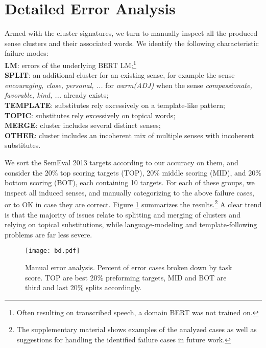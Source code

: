 \documentclass[11pt,a4paper]{article}
\begin{document}
\section{Detailed Error Analysis}
\vspace{-5pt}
\label{sec:analysis}
Armed with the cluster signatures, we turn to manually inspect all the produced sense clusters and their associated words. We  identify the following characteristic failure modes:\\\textbf{LM}: errors of the underlying BERT LM;\footnote{Often resulting on transcribed speech, a domain BERT was not trained on.}
\\\textbf{SPLIT}: an additional cluster for an existing sense, for example the
sense \emph{encouraging, close, personal, ...} for \emph{warm(ADJ)} when the sense
\emph{compassionate, favorable, kind, ...} already exists;
\\\textbf{TEMPLATE}: substitutes rely excessively on a template-like pattern;
\\\textbf{TOPIC}: substitutes rely excessively on topical words;
\\\textbf{MERGE}: cluster includes several distinct senses;
\\\textbf{OTHER}: cluster includes an incoherent mix of multiple senses with
incoherent substitutes.

We sort the SemEval 2013 targets according to our accuracy on them, and consider
the 20\% top scoring targets (TOP), 20\% middle scoring (MID), and 20\% bottom scoring (BOT), each containing 10 targets.
For each of these groups, we inspect all induced senses, and manually categorizing to
the above failure cases, or to OK in case they are correct. Figure \ref{fig:qualbd}
summarizes the results.\footnote{The supplementary material shows examples of the analyzed cases as well as suggestions for handling the identified failure cases in future work.} A clear trend is that the majority of issues relate to splitting and merging of clusters and relying on topical substitutions, while language-modeling and template-following problems are far less severe.



\begin{figure}[t!]
\centering
      \texttt{[image: bd.pdf]}
    \caption{Manual error analysis. Percent of error cases broken down by task score. TOP are best 20\% preforming targets, MID and BOT are third and last 20\% splits accordingly. }
    \label{fig:qualbd}
\end{figure}
\end{document}

